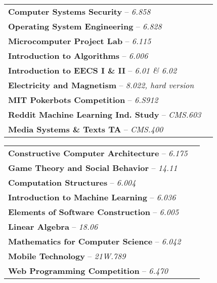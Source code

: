 \documentclass[11pt]{article}
\begin{document}
    \begin{multicols}{2}
        \noindent
        \begin{tabular*}{\textwidth}{l@{\extracolsep{\fill}}r}
            \textbf{Computer Systems Security} -- \emph{6.858}\\
            \textbf{Operating System Engineering} -- \emph{6.828}\\
            \textbf{Microcomputer Project Lab} -- \emph{6.115}\\
            \textbf{Introduction to Algorithms} -- \emph{6.006} \\
            \textbf{Introduction to EECS I \& II} -- \emph{6.01 \& 6.02} \\
            \textbf{Electricity and Magnetism} -- \emph{8.022, hard version} \\
            \textbf{MIT Pokerbots Competition} -- \emph{6.S912}\\
            \textbf{Reddit Machine Learning Ind. Study} -- \emph{CMS.603}\\
            \textbf{Media Systems \& Texts TA} -- \emph{CMS.400}\\
        \end{tabular*}
        \begin{tabular*}{\textwidth}{l@{\extracolsep{\fill}}r}
            \textbf{Constructive Computer Architecture} -- \emph{6.175} \\
            \textbf{Game Theory and Social Behavior} -- \emph{14.11} \\
            \textbf{Computation Structures} -- \emph{6.004} \\
            \textbf{Introduction to Machine Learning} -- \emph{6.036} \\
            \textbf{Elements of Software Construction} -- \emph{6.005} \\
            \textbf{Linear Algebra} -- \emph{18.06}  \\
            \textbf{Mathematics for Computer Science} -- \emph{6.042} \\
            \textbf{Mobile Technology} -- \emph{21W.789}\\
            \textbf{Web Programming Competition} -- \emph{6.470}
        \end{tabular*}
    \end{multicols}
\end{document}
